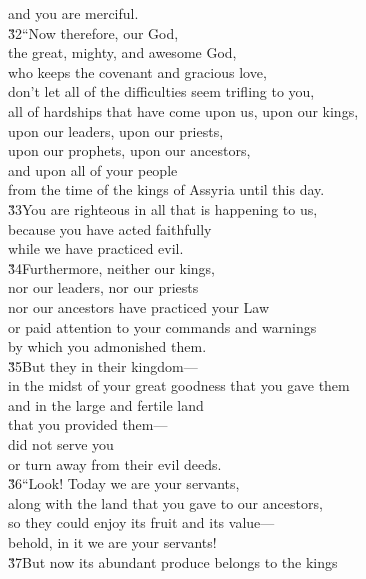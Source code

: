 \begin{poetry}
\poemll    and you are merciful. \\
\poeml \v{32}``Now therefore, our God, \\
\poemll    the great, mighty, and awesome God, \\
\poemlll       who keeps the covenant and gracious love, \\
\poeml don't let all of the difficulties seem trifling to you, \\
\poemll    all of hardships that have come upon us, upon our kings, \\
\poeml upon our leaders, upon our priests, \\
\poemll    upon our prophets, upon our ancestors, \\
\poeml and upon all of your people \\
\poemll    from the time of the kings of Assyria until this day. \\
\poeml \v{33}You are righteous in all that is happening to us, \\
\poemll    because you have acted faithfully \\
\poemlll       while we have practiced evil. \\
\poeml \v{34}Furthermore, neither our kings, \\
\poemll    nor our leaders, nor our priests \\
\poemlll       nor our ancestors have practiced your Law \\
\poeml or paid attention to your commands and warnings \\
\poemll    by which you admonished them. \\
\poeml \v{35}But they in their kingdom--- \\
\poemll    in the midst of your great goodness that you gave them \\
\poeml and in the large and fertile land \\
\poemll    that you provided them--- \\
\poeml did not serve you \\
\poemll    or turn away from their evil deeds. \\
\poeml \v{36}``Look! Today we are your servants, \\
\poemll    along with the land that you gave to our ancestors, \\
\poeml so they could enjoy its fruit and its value--- \\
\poemll    behold, in it we are your servants! \\
\poeml \v{37}But now its abundant produce belongs to the kings \\

\end{poetry}

